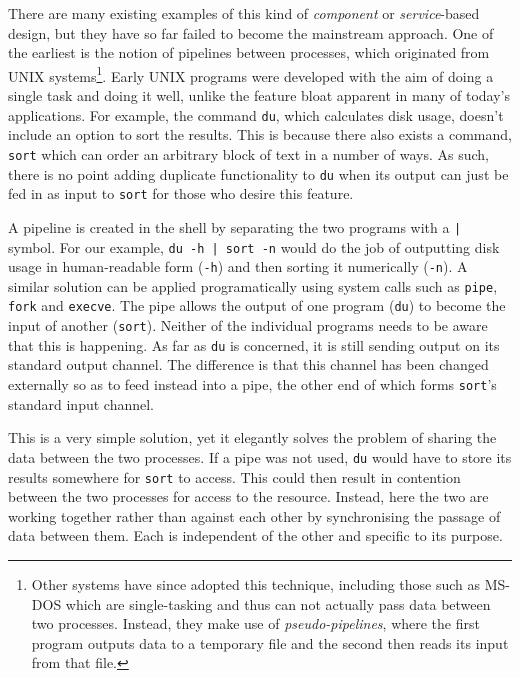 There are many existing examples of this kind of \emph{component} or
\emph{service}-based design, but they have so far failed to become the
mainstream approach.  One of the earliest is the notion of pipelines
between processes, which originated from UNIX systems\footnote{Other
  systems have since adopted this technique, including those such as
  MS-DOS which are single-tasking and thus can not actually pass data
  between two processes.  Instead, they make use of
  \emph{pseudo-pipelines}, where the first program outputs data to a
  temporary file and the second then reads its input from that file.}.
Early UNIX programs were developed with the aim of doing a single task
and doing it well, unlike the feature bloat apparent in many of
today's applications.  For example, the command \texttt{du}, which
calculates disk usage, doesn't include an option to sort the results.
This is because there also exists a command, \texttt{sort} which can
order an arbitrary block of text in a number of ways.  As such, there
is no point adding duplicate functionality to \texttt{du} when its
output can just be fed in as input to \texttt{sort} for those who
desire this feature.

A pipeline is created in the shell by separating the two programs with
a \texttt{|} symbol.  For our example, \texttt{du -h | sort -n} would
do the job of outputting disk usage in human-readable form
(\texttt{-h}) and then sorting it numerically (\texttt{-n}).  A
similar solution can be applied programatically using system calls
such as \texttt{pipe}, \texttt{fork} and \texttt{execve}.  The pipe
allows the output of one program (\texttt{du}) to become the input of
another (\texttt{sort}).  Neither of the individual programs needs to
be aware that this is happening.  As far as \texttt{du} is concerned,
it is still sending output on its standard output channel.  The
difference is that this channel has been changed externally so as to
feed instead into a pipe, the other end of which forms \texttt{sort}'s
standard input channel.

This is a very simple solution, yet it elegantly solves the problem of
sharing the data between the two processes.  If a pipe was not used,
\texttt{du} would have to store its results somewhere for
\texttt{sort} to access.  This could then result in contention between
the two processes for access to the resource.  Instead, here the two
are working together rather than against each other by synchronising
the passage of data between them.  Each is independent of the other
and specific to its purpose.

